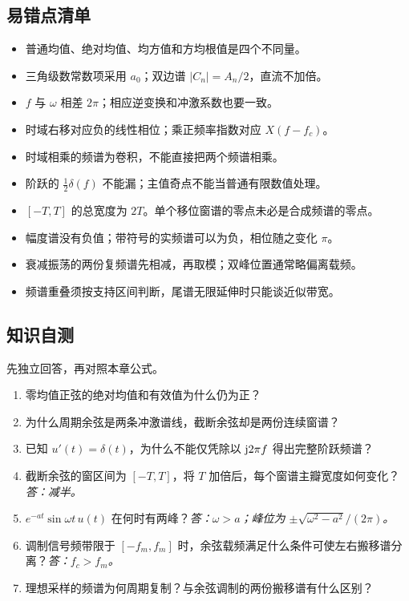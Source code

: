 \subsection*{易错点清单}
\begin{itemize}
\item 普通均值、绝对均值、均方值和方均根值是四个不同量。
\item 三角级数常数项采用 $a_0$；双边谱 $|C_n|=A_n/2$，直流不加倍。
\item $f$ 与 $\omega$ 相差 $2\pi$；相应逆变换和冲激系数也要一致。
\item 时域右移对应负的线性相位；乘正频率指数对应 $X(f-f_c)$。
\item 时域相乘的频谱为卷积，不能直接把两个频谱相乘。
\item 阶跃的 $\tfrac12\delta(f)$ 不能漏；主值奇点不能当普通有限数值处理。
\item $[-T,T]$ 的总宽度为 $2T$。单个移位窗谱的零点未必是合成频谱的零点。
\item 幅度谱没有负值；带符号的实频谱可以为负，相位随之变化 $\pi$。
\item 衰减振荡的两份复频谱先相减，再取模；双峰位置通常略偏离载频。
\item 频谱重叠须按支持区间判断，尾谱无限延伸时只能谈近似带宽。
\end{itemize}

\subsection*{知识自测}
先独立回答，再对照本章公式。
\begin{enumerate}
\item 零均值正弦的绝对均值和有效值为什么仍为正？
\item 为什么周期余弦是两条冲激谱线，截断余弦却是两份连续窗谱？
\item 已知 $u'(t)=\delta(t)$，为什么不能仅凭除以 $\mathrm{j}2\pi f$ 得出完整阶跃频谱？
\item 截断余弦的窗区间为 $[-T,T]$，将 $T$ 加倍后，每个窗谱主瓣宽度如何变化？\textit{答：减半。}
\item $e^{-at}\sin\omega t\,u(t)$ 在何时有两峰？\textit{答：$\omega>a$；峰位为 $\pm\sqrt{\omega^2-a^2}/(2\pi)$。}
\item 调制信号频带限于 $[-f_m,f_m]$ 时，余弦载频满足什么条件可使左右搬移谱分离？\textit{答：$f_c>f_m$。}
\item 理想采样的频谱为何周期复制？与余弦调制的两份搬移谱有什么区别？
\end{enumerate}

